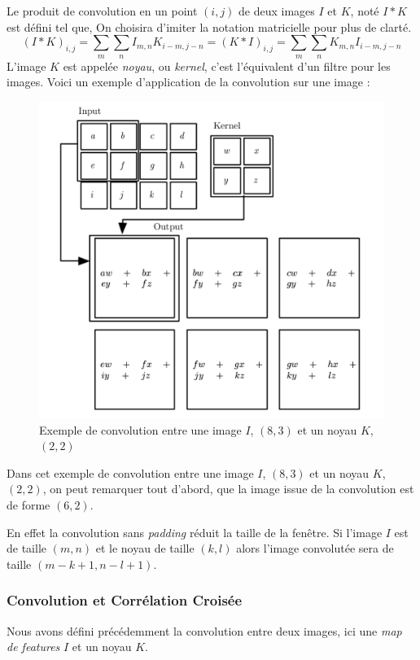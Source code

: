 \documentclass[a4paper, 11pt]{report}
\begin{document}
Le produit de convolution en un point $(i,j)$ de deux images $I$ et $K$, noté $I * K$ est défini tel que,
On choisira d'imiter la notation matricielle pour plus de clarté.
$$(I*K)_{i,j} = \sum_{m}\sum_{n}{I_{m,n}K_{i-m,j-n}} = (K*I)_{i,j} = \sum_{m}\sum_{n}{K_{m,n}I_{i-m,j-n}}$$
L'image $K$ est appelée \emph{noyau}, ou \emph{kernel}, c'est l'équivalent d'un filtre pour les images.
Voici un exemple d'application de la convolution sur une image :
\begin{figure}[H]
	\begin{center}
		\includegraphics[scale=0.25]{Images/Convolution.png}
		\caption{Exemple de convolution entre une image $I$, $(8,3)$ et un noyau $K$, $(2,2)$}
	\end{center}
\end{figure}
Dans cet exemple de convolution entre une image $I$, $(8,3)$ et un noyau $K$, $(2,2)$, on peut remarquer tout d'abord, que la image issue de la convolution est de forme $(6,2)$.

En effet la convolution sans \emph{padding} réduit la taille de la fenêtre.
Si l'image $I$ est de taille $(m,n)$ et le noyau de taille $(k,l)$ alors l'image convolutée sera de taille $(m-k+1,n-l+1)$.
\subsubsection{Convolution et Corrélation Croisée}
Nous avons défini précédemment la convolution entre deux images, ici une \emph{map de features} $I$ et un noyau $K$.
\end{document}
